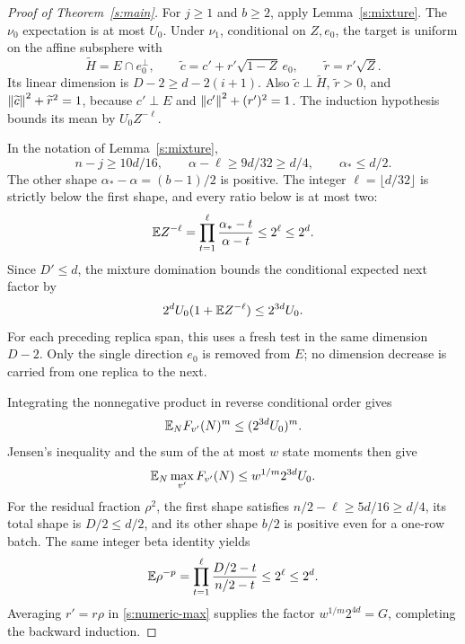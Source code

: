 \begin{proof}[Proof of Theorem~\ref{s:main}]
For \(j\ge1\) and \(b\ge2\), apply Lemma~\ref{s:mixture}. The
\(\nu_0\) expectation is at most \(U_0\). Under \(\nu_1\),
conditional on \(Z,e_0\), the target is uniform on the affine
subsphere with
\[
 \widetilde H=E\cap e_0^\perp,\qquad
 \widetilde c=c'+r'\sqrt{1-Z}\,e_0,\qquad
 \widetilde r=r'\sqrt Z.
\]
Its linear dimension is \(D-2\ge d-2(i+1)\). Also
\(\widetilde c\perp\widetilde H\), \(\widetilde r>0\), and
\(\left\lVert \widetilde c\right\rVert^2+\widetilde r^2=1\), because \(c'\perp E\)
and \(\left\lVert c'\right\rVert^2+(r')^2=1\). The induction hypothesis bounds its
mean by \(U_0Z^{-\ell}\).

In the notation of Lemma~\ref{s:mixture},
\[
 n-j\ge10d/16,\qquad
 \alpha-\ell\ge9d/32\ge d/4,\qquad
 \alpha_*\le d/2.
\]
The other shape \(\alpha_*-\alpha=(b-1)/2\) is positive.
The integer \(\ell=\lfloor d/32\rfloor\) is strictly below the
first shape, and every ratio below is at most two:
\begin{equation}\label{s:mixture-inverse}
 \mathbb E Z^{-\ell}
 =\prod_{t=1}^{\ell}\frac{\alpha_*-t}{\alpha-t}
 \le2^\ell\le2^d.
\end{equation}
Since \(D'\le d\), the mixture domination bounds the conditional
expected next factor by
\[
 2^dU_0(1+\mathbb E Z^{-\ell})\le2^{3d}U_0.
\]
For each preceding replica span, this uses a fresh test in the same
dimension \(D-2\). Only the single direction \(e_0\) is removed from
\(E\); no dimension decrease is carried from one replica to the next.

Integrating the nonnegative product in reverse conditional order gives
\[
 \mathbb E_NF_{v'}(N)^m\le(2^{3d}U_0)^m.
\]
Jensen's inequality and the sum of the at most \(w\) state moments
then give
\[
 \mathbb E_N\max_{v'}F_{v'}(N)\le w^{1/m}2^{3d}U_0.
\]
For the residual fraction \(\rho^2\), the first shape satisfies
\(n/2-\ell\ge5d/16\ge d/4\), its total shape is \(D/2\le d/2\),
and its other shape \(b/2\) is positive even for a one-row batch.
The same integer beta identity yields
\begin{equation}\label{s:residual-inverse-numeric}
 \mathbb E\rho^{-p}
 =\prod_{t=1}^{\ell}\frac{D/2-t}{n/2-t}
 \le2^\ell\le2^d.
\end{equation}
Averaging \(r'=r\rho\) in \eqref{s:numeric-max} supplies the factor
\(w^{1/m}2^{4d}=G\), completing the backward induction.


\end{proof}
